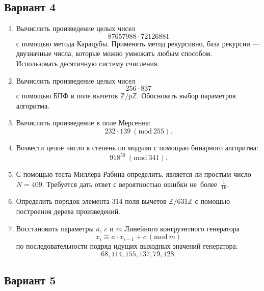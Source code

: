 \documentclass[14pt]{extarticle}
\begin{document}
\clearpage	\subsection{Вариант 4}
	\begin{enumerate}
		\item Вычислить произведение целых чисел \[87657988 \cdot 72126881\] с помощью метода Карацубы. Применять метод рекурсивно, база рекурсии — двузначные числа, которые можно умножать любым способом.\\ Использовать десятичную систему счисления.
		\item Вычислить произведение целых чисел \[256 \cdot 837\] с помощью БПФ в поле вычетов $\mathbb{Z}/p\mathbb{Z}$. Обосновать выбор параметров алгоритма.
		\item Вычислить произведение в поле Мерсенна: \[232 \cdot 139\ (\textrm{mod}\ 255).\]
		\item Возвести целое число в степень по модулю с помощью бинарного алгоритма: \[918^{59}\ (\textrm{mod}\ 341).\]
		\item С помощью теста Миллера-Рабина определить, является ли простым число $N = 409$. Требуется дать ответ с вероятностью ошибки не~более~$\frac{1}{16}$.
		\item Определить порядок элемента $314$ поля вычетов $\mathbb{Z}/631\mathbb{Z}$ с помощью построения дерева произведений.
		\item Восстановить параметры $a$, $c$ и $m$ Линейного конгруэнтного генератора \[x_i \equiv a \cdot x_{i-1} + c\ (\textrm{mod}\ m)\] по последовательности подряд идущих выходных значений генератора: \[68, 114, 155, 137, 79, 128.\]
	\end{enumerate}
\clearpage	\subsection{Вариант 5}
\end{document}

